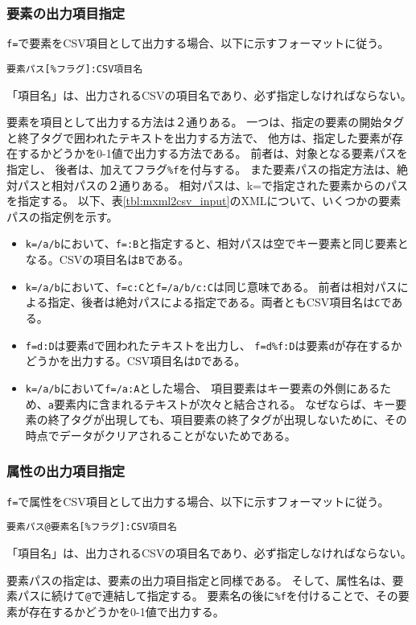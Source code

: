 \subsubsection*{要素の出力項目指定}
\verb|f=|で要素をCSV項目として出力する場合、以下に示すフォーマットに従う。

\verb|要素パス[%フラグ]:CSV項目名|

「項目名」は、出力されるCSVの項目名であり、必ず指定しなければならない。

要素を項目として出力する方法は２通りある。
一つは、指定の要素の開始タグと終了タグで囲われたテキストを出力する方法で、
他方は、指定した要素が存在するかどうかを0-1値で出力する方法である。
前者は、対象となる要素パスを指定し、
後者は、加えてフラグ\verb|%f|を付与する。
また要素パスの指定方法は、絶対パスと相対パスの２通りある。
相対パスは、k=で指定された要素からのパスを指定する。
以下、表\ref{tbl:mxml2csv_input}のXMLについて、いくつかの要素パスの指定例を示す。

\begin{itemize}
\item \verb|k=/a/b|において、\verb|f=:B|と指定すると、相対パスは空でキー要素と同じ要素となる。CSVの項目名は\verb|B|である。
\item \verb|k=/a/b|において、\verb|f=c:C|と\verb|f=/a/b/c:C|は同じ意味である。
前者は相対パスによる指定、後者は絶対パスによる指定である。両者ともCSV項目名は\verb|C|である。
\item \verb|f=d:D|は要素\verb|d|で囲われたテキストを出力し、
\verb|f=d%f:D|は要素\verb|d|が存在するかどうかを出力する。CSV項目名は\verb|D|である。
\item \verb|k=/a/b|において\verb|f=/a:A|とした場合、
項目要素はキー要素の外側にあるため、\verb|a|要素内に含まれるテキストが次々と結合される。
なぜならば、キー要素の終了タグが出現しても、項目要素の終了タグが出現しないために、その時点でデータがクリアされることがないためである。
\end{itemize}

\subsubsection*{属性の出力項目指定}
\verb|f=|で属性をCSV項目として出力する場合、以下に示すフォーマットに従う。

\verb|要素パス@要素名[%フラグ]:CSV項目名|

「項目名」は、出力されるCSVの項目名であり、必ず指定しなければならない。

要素パスの指定は、要素の出力項目指定と同様である。
そして、属性名は、要素パスに続けて\verb|@|で連結して指定する。
要素名の後に\verb|%f|を付けることで、その要素が存在するかどうかを0-1値で出力する。

